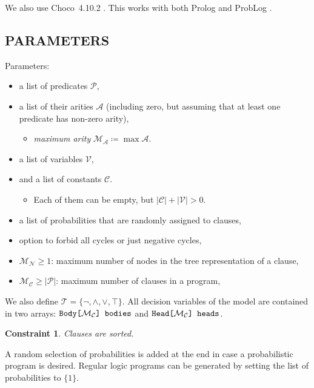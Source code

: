 \documentclass[letterpaper]{article}
\newtheorem{constraint}{Constraint}
\theoremstyle{definition}
\newcommand{\variable}[1]{\texttt{\textup{#1}}}
\newcommand{\arrayt}[3]{\variable{{#3}[}{#2}\variable{] {#1}}}
\newcommand{\predicates}{\mathcal{P}}
\newcommand{\variables}{\mathcal{V}}
\newcommand{\constants}{\mathcal{C}}
\newcommand{\tokens}{\mathcal{T}}
\newcommand{\arities}{\mathcal{A}}
\newcommand{\maxArity}{\mathcal{M}_{\mathcal{A}}}
\newcommand{\maxNumNodes}{\mathcal{M}_{\mathcal{N}}}
\newcommand{\maxNumClauses}{\mathcal{M}_{\mathcal{C}}}
\begin{document}
We also use Choco~4.10.2 \citep{choco}. This works with both Prolog
\citep{DBLP:books/daglib/0041598} and ProbLog \citep{DBLP:conf/ijcai/RaedtKT07}.

\subsection{PARAMETERS}

Parameters:
\begin{itemize}
\item a list of predicates $\predicates{}$,
\item a list of their arities $\arities{}$ (including zero, but assuming that at
  least one predicate has non-zero arity),
  \begin{itemize}
  \item \emph{maximum arity} $\maxArity{} \coloneqq \max \arities{}$.
  \end{itemize}
\item a list of variables $\variables{}$,
\item and a list of constants $\constants{}$.
  \begin{itemize}
  \item Each of them can be empty, but $|\constants{}| + |\variables{}| > 0$.
  \end{itemize}
\item a list of probabilities that are randomly assigned to clauses,
\item option to forbid all cycles or just negative cycles,
\item $\maxNumNodes{} \ge 1$: maximum number of nodes in the tree representation
  of a clause,
\item $\maxNumClauses{} \ge |\predicates{}|$: maximum number of clauses in a
  program,
\end{itemize}

We also define $\tokens{} = \{ \neg, \land, \lor, \top \}$. All decision
variables of the model are contained in two arrays:
$\arrayt{bodies}{\maxNumClauses{}}{Body}$ and
$\arrayt{heads}{\maxNumClauses{}}{Head}$.

\begin{constraint}
  Clauses are sorted.
\end{constraint}

A random selection of probabilities is added at the end in case a
probabilistic program is desired. Regular logic programs can be generated by
setting the list of probabilities to $\{ 1 \}$.
\end{document}
